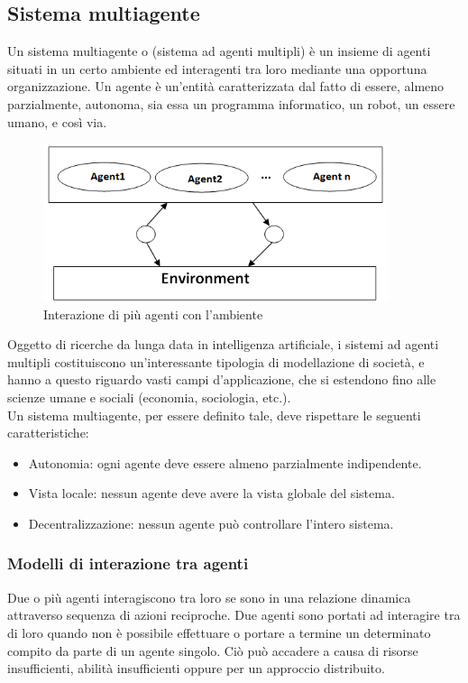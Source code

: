 \documentclass[12pt]{article}
\begin{document}
\newpage

\subsection{Sistema multiagente}
Un sistema multiagente o (sistema ad agenti multipli) è un insieme di agenti situati in un certo ambiente ed interagenti tra loro mediante una opportuna organizzazione. Un agente è un'entità caratterizzata dal fatto di essere, almeno parzialmente, autonoma, sia essa un programma informatico, un robot, un essere umano, e così via.

\begin{figure}[ht]
\centering
\includegraphics[width=0.9\textwidth,height=\textheight,keepaspectratio]{Figures/Vario/MAS.png}
\caption[Interazione di più agenti con l'ambiente]{Interazione di più agenti con l'ambiente}
\label{fig:MAS}
\end{figure}

\noindent Oggetto di ricerche da lunga data in intelligenza artificiale, i sistemi ad agenti multipli costituiscono un'interessante tipologia di modellazione di società, e hanno a questo riguardo vasti campi d'applicazione, che si estendono fino alle scienze umane e sociali (economia, sociologia, etc.). \cite{SistemaMultiagente}\\

\noindent Un sistema multiagente, per essere definito tale, deve rispettare le seguenti caratteristiche: \cite{CaratteristicheMAS}
\begin{itemize}
\item Autonomia: ogni agente deve essere almeno parzialmente indipendente.
\item Vista locale: nessun agente deve avere la vista globale del sistema.
\item Decentralizzazione: nessun agente può controllare l'intero sistema.
\end{itemize}

\newpage
\subsubsection{Modelli di interazione tra agenti}
Due o più agenti interagiscono tra loro se sono in una relazione dinamica attraverso sequenza di azioni reciproche. Due agenti sono portati ad interagire tra di loro quando non è possibile effettuare o portare a termine un determinato compito da parte di un agente singolo. Ciò può accadere a causa di risorse insufficienti, abilità insufficienti oppure per un approccio distribuito.\\
\end{document}
